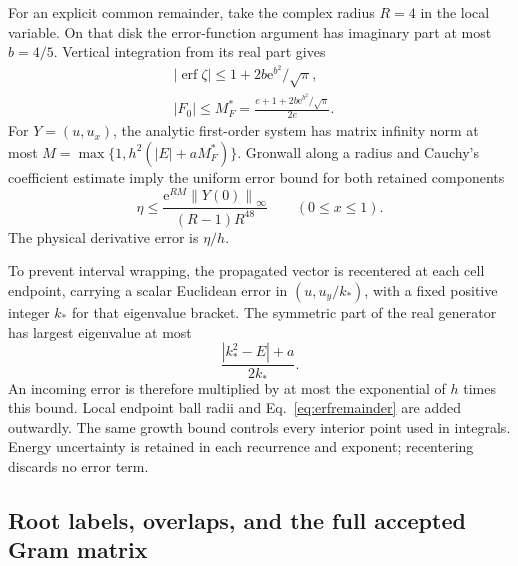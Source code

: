 \documentclass[aps,pra,reprint,superscriptaddress,longbibliography]{revtex4-2}
\newcommand{\ee}{\mathrm e}
\newcommand{\norm}[1]{\left\lVert#1\right\rVert}
\begin{document}
For an explicit common remainder, take the complex radius $R=4$
in the local variable. On that disk the error-function argument has
imaginary part at most $b=4/5$. Vertical integration from its real
part gives
\begin{equation}
 \begin{gathered}
 |\operatorname{erf}\zeta|\le1+2b\ee^{b^2}/\sqrt\pi,
 \qquad\\ |F_0|\le M_F^*=\frac{e+1+2b\ee^{b^2}/\sqrt\pi}{2e}.
 \end{gathered}
\end{equation}
For $Y=(u,u_x)$, the analytic first-order system has matrix
infinity norm at most $M=\max\{1,h^2(|E|+aM_F^*)\}$.
Gronwall along a radius and Cauchy's coefficient estimate imply
the uniform error bound for both retained components
\begin{equation}
 \eta\le\frac{\ee^{RM}\norm{Y(0)}_\infty}{(R-1)R^{48}}
                         \qquad(0\le x\le1).                 \label{eq:erfremainder}
\end{equation}
The physical derivative error is $\eta/h$.

To prevent interval wrapping, the propagated vector is recentered
at each cell endpoint, carrying a scalar Euclidean error in
$(u,u_y/k_*)$, with a fixed positive integer $k_*$ for that
eigenvalue bracket. The symmetric part of the real generator
has largest eigenvalue at most
\begin{equation}
             \frac{|k_*^2-E|+a}{2k_*}.
\end{equation}
An incoming error is therefore multiplied by at most the
exponential of $h$ times this bound. Local endpoint ball radii
and Eq.~\eqref{eq:erfremainder} are added outwardly. The same
growth bound controls every interior point used in integrals.
Energy uncertainty is retained in each recurrence and exponent;
recentering discards no error term.

\subsection{Root labels, overlaps, and the full accepted Gram matrix}
\end{document}
